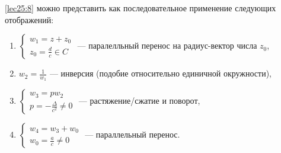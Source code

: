 \documentclass[../../main.tex]{subfiles}
\begin{document}
\begin{enumerate}
\eqref{lec25:8} можно представить как последовательное применение следующих
отображений:
		 \begin{enumerate}
	 	\item 
	 	$ \begin{cases} 
 	 	w_1 = z + z_0\\
  	  	z_0 = \frac{d}{c} \in C
		\end{cases}$ --- паралелльный перенос на радиус-вектор числа $z_0$,
\item $w_2 = \frac{1}{w_1}$ --- инверсия (подобие относительно единичной
окружности),
		\item 
		$ \begin{cases} 
 	 	w_3 = pw_2\\
  	  	p = -\frac{\Delta}{c^2} \ne 0
		\end{cases}$ --- растяжение/сжатие и поворот,
		\item 
		$ \begin{cases} 
 	 	w_4 = w_3 + w_0\\
  	  	w_0 = \frac{a}{c} \ne 0
		\end{cases}$ --- параллельный перенос.
	 	 \end{enumerate}
 \end{enumerate}
\end{document}
